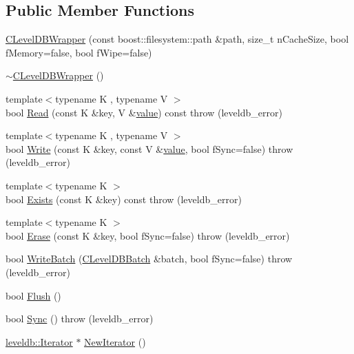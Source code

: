 \subsection*{Public Member Functions}
\begin{DoxyCompactItemize}
\item 
\hyperlink{class_c_level_d_b_wrapper_ae796b1190c072df6275e0ada4d187943}{C\+Level\+D\+B\+Wrapper} (const boost\+::filesystem\+::path \&path, size\+\_\+t n\+Cache\+Size, bool f\+Memory=false, bool f\+Wipe=false)
\item 
\hyperlink{class_c_level_d_b_wrapper_a7ffe7edeadfcf521d32509216e95403b}{$\sim$\+C\+Level\+D\+B\+Wrapper} ()
\item 
{\footnotesize template$<$typename K , typename V $>$ }\\bool \hyperlink{class_c_level_d_b_wrapper_aa3b816ae43c930b4bf1f85461bff4b5b}{Read} (const K \&key, V \&\hyperlink{cache_8cc_a0f61d63b009d0880a89c843bd50d8d76}{value}) const   throw (leveldb\+\_\+error)
\item 
{\footnotesize template$<$typename K , typename V $>$ }\\bool \hyperlink{class_c_level_d_b_wrapper_a740caa1aefbafc888838ea7f70dc31f4}{Write} (const K \&key, const V \&\hyperlink{cache_8cc_a0f61d63b009d0880a89c843bd50d8d76}{value}, bool f\+Sync=false)  throw (leveldb\+\_\+error)
\item 
{\footnotesize template$<$typename K $>$ }\\bool \hyperlink{class_c_level_d_b_wrapper_a9c9d2e1c06c45c5d6883f33136f6718b}{Exists} (const K \&key) const   throw (leveldb\+\_\+error)
\item 
{\footnotesize template$<$typename K $>$ }\\bool \hyperlink{class_c_level_d_b_wrapper_a9f67e2880ba191fdc9439ba34e315d72}{Erase} (const K \&key, bool f\+Sync=false)  throw (leveldb\+\_\+error)
\item 
bool \hyperlink{class_c_level_d_b_wrapper_a820484c9e427f9e3400396e750acf4b8}{Write\+Batch} (\hyperlink{class_c_level_d_b_batch}{C\+Level\+D\+B\+Batch} \&batch, bool f\+Sync=false)  throw (leveldb\+\_\+error)
\item 
bool \hyperlink{class_c_level_d_b_wrapper_a639fbfd6652941a1ab570c202197a32a}{Flush} ()
\item 
bool \hyperlink{class_c_level_d_b_wrapper_abd05e914893cd610e8444871f829d8c9}{Sync} ()  throw (leveldb\+\_\+error)
\item 
\hyperlink{classleveldb_1_1_iterator}{leveldb\+::\+Iterator} $\ast$ \hyperlink{class_c_level_d_b_wrapper_a5f43d01a8a6b26464b875d190e002d74}{New\+Iterator} ()
\end{DoxyCompactItemize}


